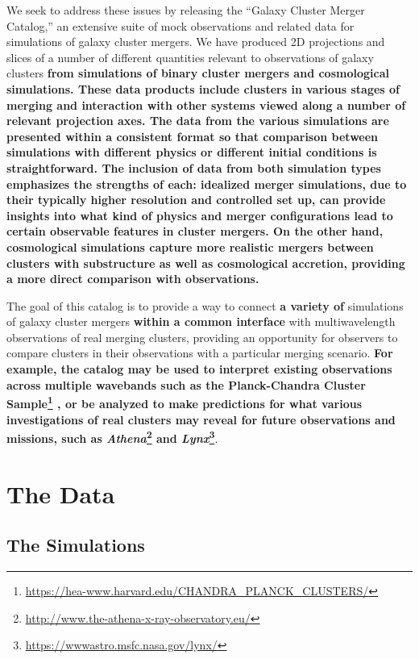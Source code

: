 \documentclass{emulateapj}
\begin{document}
We seek to address these issues by releasing the ``Galaxy Cluster Merger Catalog,'' an extensive suite of mock observations and related data for simulations of galaxy cluster mergers. We have produced 2D projections and slices of a number of different quantities relevant to observations of galaxy clusters {\bf from simulations of binary cluster mergers and cosmological simulations. {\bf These data products include clusters in various stages of merging and interaction with other systems viewed along a number of relevant projection axes. The data from the various simulations are presented within a consistent format so that comparison between simulations with different physics or different initial conditions is straightforward.} The inclusion of data from both simulation types emphasizes the strengths of each: idealized merger simulations, due to their typically higher resolution and controlled set up, can provide insights into what kind of physics and merger configurations lead to certain observable features in cluster mergers. On the other hand, cosmological simulations capture more realistic mergers between clusters with substructure as well as cosmological accretion, providing a more direct comparison with observations.}

The goal of this catalog is to provide a way to connect {\bf a variety of} simulations of galaxy cluster mergers {\bf within a common interface} with multiwavelength observations of real merging clusters, providing an opportunity for observers to compare clusters in their observations with a particular merging scenario. {\bf For example, the catalog may be used to interpret existing observations across multiple wavebands such as the Planck-Chandra Cluster Sample\footnote{\url{https://hea-www.harvard.edu/CHANDRA_PLANCK_CLUSTERS/}} \citep{jon16}, or be analyzed to make predictions for what various investigations of real clusters may reveal for future observations and missions, such as {\it Athena}\footnote{\url{http://www.the-athena-x-ray-observatory.eu/}} and {\it Lynx}\footnote{\url{https://wwwastro.msfc.nasa.gov/lynx/}}}.

\section{The Data}

\subsection{The Simulations}
\end{document}
